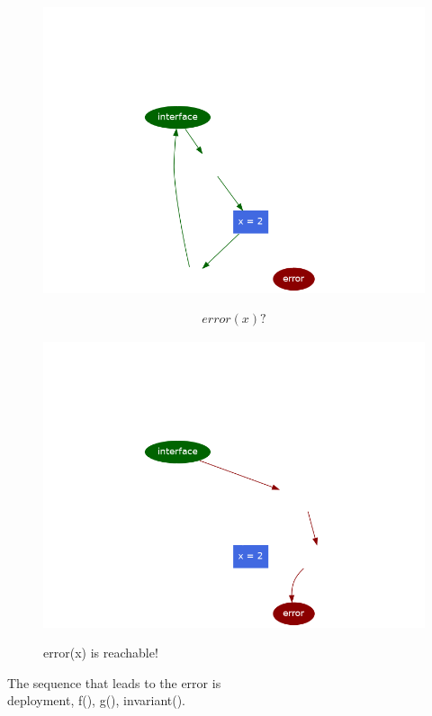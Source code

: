\documentclass[aspectratio=169,10pt]{beamer}
\begin{document}
\begin{frame}[fragile]
\begin{figure}
\noindent\begin{minipage}{.49\textwidth}
	\includegraphics[scale=0.3]{images/state_machine_counterexample_path_2}
\end{minipage}
\noindent\begin{minipage}{.49\textwidth}
{\small
\begin{align*}
	error(x) ?
\end{align*}
}%
\end{minipage}
\end{figure}
\end{frame}

\begin{frame}[fragile]
\begin{figure}
\noindent\begin{minipage}{.49\textwidth}
	\includegraphics[scale=0.3]{images/state_machine_counterexample_path_3}
\end{minipage}
\noindent\begin{minipage}{.49\textwidth}
{\small
	error(x) is reachable!
}%
\end{minipage}
\end{figure}
The sequence that leads to the error is\\
deployment, f(), g(), invariant().
\end{frame}
\end{document}
